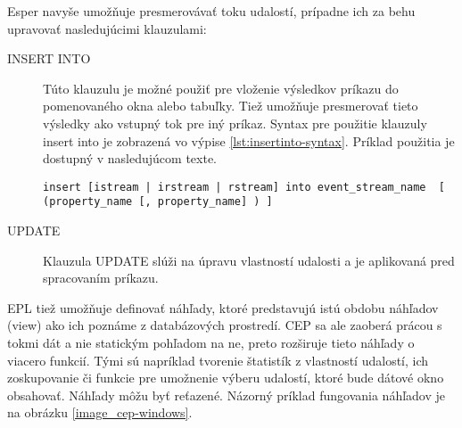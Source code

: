 		Esper navyše umožňuje presmerovávať toku udalostí, prípadne ich za behu upravovať nasledujúcimi klauzulami:
		\begin{description}
			\item[INSERT INTO] Túto klauzulu je možné použiť pre vloženie výsledkov príkazu do pomenovaného okna alebo tabuľky. Tiež umožňuje presmerovať tieto výsledky ako vstupný tok pre iný príkaz. Syntax pre použitie klauzuly insert into je zobrazená vo výpise \ref{lst:insertinto-syntax}. Príklad použitia je dostupný v nasledujúcom texte.
			\begin{lstlisting}[label=lst:insertinto-syntax]
			insert [istream | irstream | rstream] into event_stream_name  [ (property_name [, property_name] ) ]
			\end{lstlisting}
			\item[UPDATE] Klauzula UPDATE slúži na úpravu vlastností udalosti a je aplikovaná pred spracovaním príkazu.
		\end{description}

		EPL tiež umožňuje definovať náhľady, ktoré predstavujú istú obdobu náhľadov (view) ako ich poznáme z databázových prostredí. CEP sa ale zaoberá prácou s tokmi dát a nie statickým pohľadom na ne, preto rozširuje tieto náhľady o viacero funkcií. Tými sú napríklad tvorenie štatistík z vlastností udalostí, ich zoskupovanie či funkcie pre umožnenie výberu udalostí, ktoré bude dátové okno obsahovať. Náhľady môžu byť reťazené. Názorný príklad fungovania náhľadov je na obrázku \ref{image_cep-windows}.
	

